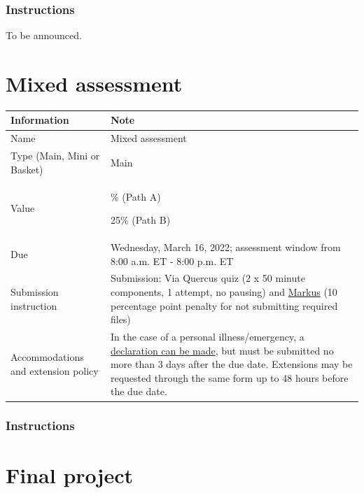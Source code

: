 \documentclass[
  openany]{book}
\begin{document}
\hypertarget{instructions-1}{%
\subsection{Instructions}\label{instructions-1}}

To be announced.

\hypertarget{mixed-assessment}{%
\chapter{Mixed assessment}\label{mixed-assessment}}

\begin{longtable}[]{@{}
  >{\raggedright\arraybackslash}p{}
  >{\raggedright\arraybackslash}p{}@{}}
\toprule
\textbf{Information} & \textbf{Note} \\
\midrule
\endhead
Name & Mixed assessment \\
Type (Main, Mini or Basket) & Main \\
Value & 20\% (Path A)

25\% (Path B) \\
Due & Wednesday, March 16, 2022; assessment window from 8:00 a.m. ET - 8:00 p.m. ET \\
Submission instruction & Submission: Via Quercus quiz (2 x 50 minute components, 1 attempt, no pausing) and \href{https://markus-ds.teach.cs.toronto.edu/}{Markus} (10 percentage point penalty for not submitting required files) \\
Accommodations and extension policy & In the case of a personal illness/emergency, a \href{https://forms.office.com/Pages/ResponsePage.aspx?id=JsKqeAMvTUuQN7RtVsVSEOKHUU3SzAJJhmOKjJhDWEpUNTFDSzhZTFlXUzVYMVlNM1FEUTRZMkVWOC4u}{declaration can be made}, but must be submitted no more than 3 days after the due date. Extensions may be requested through the same form up to 48 hours before the due date. \\
\bottomrule
\end{longtable}

\hypertarget{instructions-2}{%
\subsection{Instructions}\label{instructions-2}}

\hypertarget{final-project}{%
\chapter{Final project}\label{final-project}}
\end{document}
